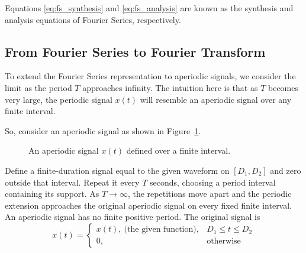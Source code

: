Equations \eqref{eq:fs_synthesis} and \eqref{eq:fs_analysis} are known as the synthesis and analysis equations of Fourier Series, respectively. 

\subsection{From Fourier Series to Fourier Transform}
To extend the Fourier Series representation to aperiodic signals, we consider the limit as the period $T$ approaches infinity. The intuition here is that as $T$ becomes very large, the periodic signal $x(t)$ will resemble an aperiodic signal over any finite interval.

So, consider an aperiodic signal as shown in Figure~\ref{fig:aperiodic_signal}. 

\begin{figure}[h!]
    \centering
    \caption{An aperiodic signal $x(t)$ defined over a finite interval.}
    \label{fig:aperiodic_signal}
\end{figure}

Define a finite-duration signal equal to the given waveform on
$[D_1,D_2]$ and zero outside that interval. Repeat it every $T$ seconds,
choosing a period interval containing its support. As $T\to\infty$, the
repetitions move apart and the periodic extension approaches the original
aperiodic signal on every fixed finite interval. An aperiodic signal has
no finite positive period. The original signal is
\[
x(t) = \begin{cases}
    x(t), \: \text{(the given function)}, & D_1 \leq t \leq D_2 \\
    0, & \text{otherwise}
\end{cases}
\]

